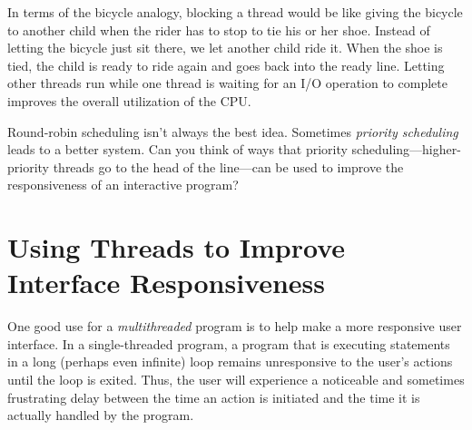 In terms of the bicycle analogy, blocking a thread would be like
giving the bicycle to another child when the rider has to stop to tie
his or her shoe.  Instead of letting the bicycle just sit there, we let
another child ride it.  When the shoe is tied, the child is ready to
ride again and goes back into the ready line.  Letting other threads
run while one thread is waiting for an I/O operation to complete
improves the overall utilization of the CPU.

\begin{SSTUDY}

\item  Round-robin scheduling isn't always the best idea.  Sometimes
{\it priority scheduling} leads to a better system.  Can you
think of ways that priority scheduling---higher-priority
threads go to the head of the line---can be used to improve
the responsiveness of an interactive \mbox{program?}
\end{SSTUDY}




\section{Using Threads to Improve \\\hspace*{2.8pc}Interface Responsiveness}
\noindent One good use for a {\it multithreaded} program is to help
make a more responsive user interface.  In a single-threaded program,
a program that is executing statements in a long (perhaps even
infinite) loop remains unresponsive to the user's actions until the
loop is exited.  Thus, the user will experience a noticeable and
sometimes frustrating delay between the time an action is initiated
and the time it is actually handled by the program.

